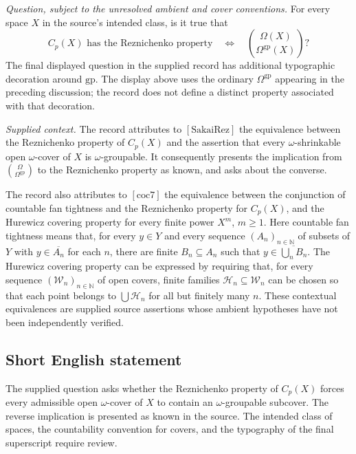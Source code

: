 \documentclass[11pt]{article}
\newcommand{\N}{\mathbb{N}}
\begin{document}
\emph{Question, subject to the unresolved ambient and cover conventions.} For every space \(X\) in the source's intended class, is it true that
\[
C_p(X)\text{ has the Reznichenko property}
\quad\Longleftrightarrow\quad
\binom{\Omega(X)}{\Omega^{\mathrm{gp}}(X)}?
\]
The final displayed question in the supplied record has additional typographic decoration around \(\mathrm{gp}\). The display above uses the ordinary \(\Omega^{\mathrm{gp}}\) appearing in the preceding discussion; the record does not define a distinct property associated with that decoration.

\emph{Supplied context.} The record attributes to \([\mathrm{SakaiRez}]\) the equivalence between the Reznichenko property of \(C_p(X)\) and the assertion that every \(\omega\)-shrinkable open \(\omega\)-cover of \(X\) is \(\omega\)-groupable. It consequently presents the implication from \(\binom{\Omega}{\Omega^{\mathrm{gp}}}\) to the Reznichenko property as known, and asks about the converse.

The record also attributes to \([\mathrm{coc7}]\) the equivalence between the conjunction of countable fan tightness and the Reznichenko property for \(C_p(X)\), and the Hurewicz covering property for every finite power \(X^m\), \(m\ge1\). Here countable fan tightness means that, for every \(y\in Y\) and every sequence \((A_n)_{n\in\N}\) of subsets of \(Y\) with \(y\in\overline{A_n}\) for each \(n\), there are finite \(B_n\subseteq A_n\) such that \(y\in\overline{\bigcup_n B_n}\). The Hurewicz covering property can be expressed by requiring that, for every sequence \((\mathcal W_n)_{n\in\N}\) of open covers, finite families \(\mathcal H_n\subseteq\mathcal W_n\) can be chosen so that each point belongs to \(\bigcup\mathcal H_n\) for all but finitely many \(n\). These contextual equivalences are supplied source assertions whose ambient hypotheses have not been independently verified.
\subsection{Short English statement}
The supplied question asks whether the Reznichenko property of \(C_p(X)\) forces every admissible open \(\omega\)-cover of \(X\) to contain an \(\omega\)-groupable subcover. The reverse implication is presented as known in the source. The intended class of spaces, the countability convention for covers, and the typography of the final superscript require review.
\end{document}
